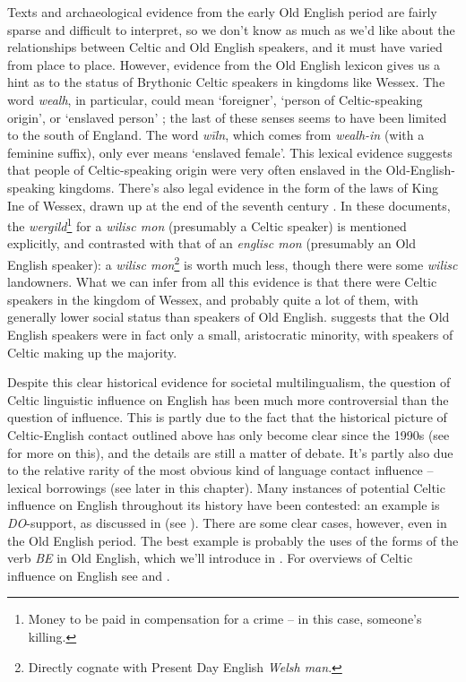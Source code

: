 Texts and archaeological evidence from the early Old English period are fairly sparse and difficult to interpret, so we don't know as much as we'd like about the relationships between Celtic and Old English speakers, and it must have varied from place to place. However, evidence from the Old English lexicon gives us a hint as to the status of Brythonic Celtic speakers in kingdoms like Wessex. The word \emph{wealh}, in particular, could mean `foreigner', `person of Celtic-speaking origin', or `enslaved person' \citep{Pelteret1995,Lutz2009}; the last of these senses seems to have been limited to the south of England. The word \emph{wīln}, which comes from \emph{wealh-in} (with a feminine suffix), only ever means `enslaved female'. This lexical evidence suggests that people of Celtic-speaking origin were very often enslaved in the Old-English-speaking kingdoms. There's also legal evidence in the form of the laws of King Ine of Wessex, drawn up at the end of the seventh century \citep{Grimmer2007,Woolf2007}. In these documents, the \emph{wergild}\footnote{Money to be paid in compensation for a crime -- in this case, someone's killing.} for a \emph{wilisc mon} (presumably a Celtic speaker) is mentioned explicitly, and contrasted with that of an \emph{englisc mon} (presumably an Old English speaker): a \emph{wilisc mon}\footnote{Directly cognate with Present Day English \textit{Welsh man}.} is worth much less, though there were some \emph{wilisc} landowners. What we can infer from all this evidence is that there were Celtic speakers in the kingdom of Wessex, and probably quite a lot of them, with generally lower social status than speakers of Old English. \citet{Higham1992} suggests that the Old English speakers were in fact only a small, aristocratic minority, with speakers of Celtic making up the majority.

Despite this clear historical evidence for societal multilingualism, the question of Celtic linguistic influence on English has been much more controversial than the question of  influence. This is partly due to the fact that the historical picture of Celtic-English contact outlined above has only become clear since the 1990s (see  for more on this), and the details are still a matter of debate. It's partly also due to the relative rarity of the most obvious kind of language contact influence -- lexical borrowings (see  later in this chapter). Many instances of potential Celtic influence on English throughout its history have been contested: an example is \emph{DO}-support, as discussed in  (see \citealp{vanderAuweraGenee2002}). There are some clear cases, however, even in the Old English period. The best example is probably the uses of the forms of the verb \textit{BE} in Old English, which we'll introduce in . For overviews of Celtic influence on English see \citet{FilppulaKlemolaPaulasto2008} and \citet{Hickey2012}.

